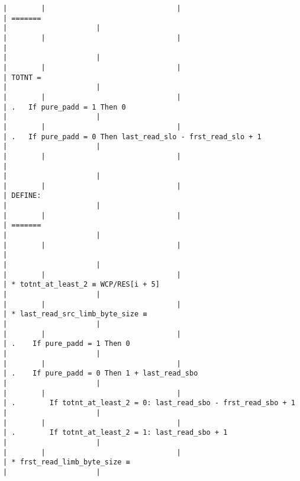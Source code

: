 \documentclass[varwidth=\maxdimen,margin=0.5cm,multi={verbatim}]{standalone}
\begin{document}
\begin{verbatim}
|        |                               |                                 | =======                                                             |                     |
|        |                               |                                 |                                                                     |                     |
|        |                               |                                 | TOTNT =                                                             |                     |
|        |                               |                                 | .   If pure_padd = 1 Then 0                                         |                     |
|        |                               |                                 | .   If pure_padd = 0 Then last_read_slo - frst_read_slo + 1         |                     |
|        |                               |                                 |                                                                     |                     |
|        |                               |                                 | DEFINE:                                                             |                     |
|        |                               |                                 | =======                                                             |                     |
|        |                               |                                 |                                                                     |                     |
|        |                               |                                 | * totnt_at_least_2 ≡ WCP/RES[i + 5]                                 |                     |
|        |                               |                                 | * last_read_src_limb_byte_size ≡                                    |                     |
|        |                               |                                 | .    If pure_padd = 1 Then 0                                        |                     |
|        |                               |                                 | .    If pure_padd = 0 Then 1 + last_read_sbo                        |                     |
|        |                               |                                 | .        If totnt_at_least_2 = 0: last_read_sbo - frst_read_sbo + 1 |                     |
|        |                               |                                 | .        If totnt_at_least_2 = 1: last_read_sbo + 1                 |                     |
|        |                               |                                 | * frst_read_limb_byte_size ≡                                        |                     |

\end{verbatim}
\end{document}
